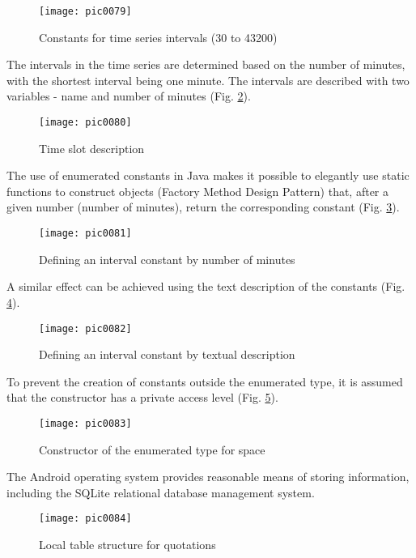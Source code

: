 \begin{figure}[h]
\centering
\texttt{[image: pic0079]}
\caption{Constants for time series intervals (30 to 43200)}
\label{fig:pic0079}
\end{figure}
\FloatBarrier

The intervals in the time series are determined based on the number of minutes, with the shortest interval being one minute. The intervals are described with two variables - name and number of minutes (Fig. \ref{fig:pic0080}).

\begin{figure}[h]
\centering
\texttt{[image: pic0080]}
\caption{Time slot description}
\label{fig:pic0080}
\end{figure}
\FloatBarrier

The use of enumerated constants in Java makes it possible to elegantly use static functions to construct objects (Factory Method Design Pattern) that, after a given number (number of minutes), return the corresponding constant (Fig. \ref{fig:pic0081}).

\begin{figure}[h]
\centering
\texttt{[image: pic0081]}
\caption{Defining an interval constant by number of minutes}
\label{fig:pic0081}
\end{figure}
\FloatBarrier

A similar effect can be achieved using the text description of the constants (Fig. \ref{fig:pic0082}).

\begin{figure}[h]
\centering
\texttt{[image: pic0082]}
\caption{Defining an interval constant by textual description}
\label{fig:pic0082}
\end{figure}
\FloatBarrier

To prevent the creation of constants outside the enumerated type, it is assumed that the constructor has a private access level (Fig. \ref{fig:pic0083}).

\begin{figure}[h]
\centering
\texttt{[image: pic0083]}
\caption{Constructor of the enumerated type for space}
\label{fig:pic0083}
\end{figure}
\FloatBarrier

The Android operating system provides reasonable means of storing information, including the SQLite relational database management system.

\begin{figure}[h]
\centering
\texttt{[image: pic0084]}
\caption{Local table structure for quotations}
\label{fig:pic0084}
\end{figure}
\FloatBarrier


